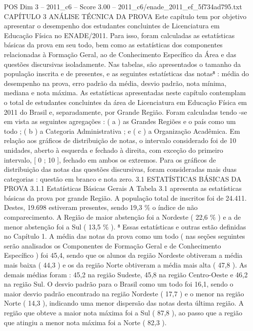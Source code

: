 \begin{textsample}{POS Dim 3 – 2011\_c6 – Score 3.00 – 2011\_c6/enade\_2011\_ef\_5f734ad795.txt}  \label{ex:f3_pos_201}
CAPÍTULO 3 ANÁLISE TÉCNICA DA PROVA Este capítulo tem por objetivo apresentar o desempenho dos estudantes concluintes de Licenciatura em Educação Física no ENADE/2011.
Para isso, foram calculadas as estatísticas básicas da prova em seu todo, bem como as estatísticas dos componentes relacionadas à Formação Geral, ao de Conhecimento Específico da Área e das questões discursivas isoladamente.
Nas tabelas, são apresentados o tamanho da população inscrita e de presentes, e as seguintes estatísticas das notas⁸ : média do desempenho na prova, erro padrão da média, desvio padrão, nota mínima, mediana e nota máxima.
As estatísticas apresentadas neste capítulo contemplam o total de estudantes concluintes da área de Licenciatura em Educação Física em 2011 do Brasil e, separadamente, por Grande Região.
Foram calculadas tendo -se em vista as seguintes agregações : ( a ) as Grandes Regiões e o país como um todo ; ( b ) a Categoria Administrativa ; e ( c ) a Organização Acadêmica.
Em relação aos gráficos de distribuição de notas, o intervalo considerado foi de 10 unidades, aberto à esquerda e fechado à direita, com exceção do primeiro intervalo, [ 0 ; 10 ], fechado em ambos os extremos.
Para os gráficos de distribuição das notas das questões discursivas, foram consideradas mais duas categorias : questão em branco e nota zero. 3.1 ESTATÍSTICAS BÁSICAS DA PROVA 3.1.1 Estatísticas Básicas Gerais A Tabela 3.1 apresenta as estatísticas básicas da prova por grande Região.
A população total de inscritos foi de 24.411.
Destes, 19.698 estiveram presentes, sendo 19,3 \% o índice de não comparecimento.
A Região de maior abstenção foi a Nordeste ( 22,6 \% ) e a de menor abstenção foi a Sul ( 13,5 \% ). ⁸ Essas estatísticas e outras estão definidas no Capítulo 1.
A média das notas da prova como um todo ( nas seções seguintes serão analisados os Componentes de Formação Geral e de Conhecimento Específico ) foi 45,4, sendo que os alunos da região Nordeste obtiveram a média mais baixa ( 44,3 ) e os da região Norte obtiveram a média mais alta ( 47,8 ).
As demais médias foram : 45,2 na região Sudeste, 45,8 na região Centro-Oeste e 46,2 na região Sul.
O desvio padrão para o Brasil como um todo foi 16,1, sendo o maior desvio padrão encontrado na região Nordeste ( 17,7 ) e o menor na região Norte ( 14,3 ), indicando uma menor dispersão das notas desta última região.
A região que obteve a maior nota máxima foi a Sul ( 87,8 ), ao passo que a região que atingiu a menor nota máxima foi a Norte ( 82,3 ).

\end{textsample}
